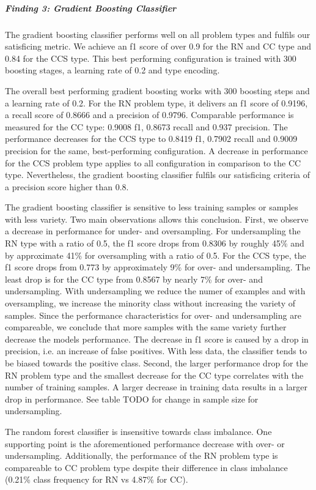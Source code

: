 \subparagraph{Finding 3: Gradient Boosting Classifier}
The gradient boosting classifier performs well on all problem types and fulfils our satisficing  metric. We achieve an f1 score of over 0.9 for the RN and CC type and 0.84 for the CCS type. This best performing configuration is trained with 300 boosting stages, a learning rate of 0.2 and type encoding.

The overall best performing gradient boosting works with 300 boosting steps and a learning rate of 0.2. For the RN problem type, it delivers an f1 score of 0.9196, a recall score of 0.8666 and a precision of 0.9796. Comparable performance is measured for the CC type: 0.9008 f1, 0.8673 recall and 0.937 precision. The performance decreases for the CCS type to 0.8419 f1, 0.7902 recall and 0.9009 precision for the same, best-performing configuration. A decrease in performance for the CCS problem type applies to all configuration in comparison to the CC type. Nevertheless, the gradient boosting classifier fulfils our satisficing criteria of a precision score higher than 0.8.

The gradient boosting classifier is sensitive to less training samples or samples with less variety. Two main observations allows this conclusion. First, we observe a decrease in performance for under- and oversampling. For undersampling the RN type with a ratio of 0.5, the f1 score drops from 0.8306 by roughly 45\% and by approximate 41\% for oversampling with a ratio of 0.5. For the CCS type, the f1 score drops from 0.773 by approximately 9\% for over- and undersampling. The least drop is for the CC type from 0.8567 by nearly 7\% for over- and undersampling. With undersampling we reduce the numer of examples and with oversampling, we increase the minority class without increasing the variety of samples. Since the performance characteristics for over- and undersampling are compareable, we conclude that more samples with the same variety further decrease the models performance. The decrease in f1 score is caused by a drop in precision, i.e. an increase of false positives. With less data, the classifier tends to be biased towards the positive class.
Second, the larger performance drop for the RN problem type and the smallest decrease for the CC type correlates with the number of training samples. A larger decrease in training data results in a larger drop in performance. See table TODO for change in sample size for undersampling. 

The random forest classifier is insensitive towards class imbalance. One supporting point is the aforementioned performance decrease with over- or undersampling. Additionally, the performance of the RN problem type is compareable to CC problem type despite their difference in class imbalance (0.21\% class frequency for RN vs 4.87\% for CC). 

